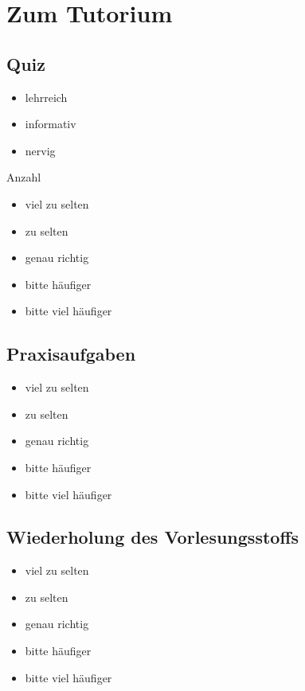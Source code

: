 \documentclass[11pt,a4paper,oneside]{scrartcl}
\begin{document}
\section{Zum Tutorium}
\subsection{Quiz}
    \begin{itemize}
        \item lehrreich
        \item informativ
        \item nervig
    \end{itemize}

Anzahl
    \begin{itemize}
        \item viel zu selten
        \item zu selten
        \item genau richtig
        \item bitte häufiger
        \item bitte viel häufiger
    \end{itemize}

\subsection{Praxisaufgaben}
    \begin{itemize}
        \item viel zu selten
        \item zu selten
        \item genau richtig
        \item bitte häufiger
        \item bitte viel häufiger
    \end{itemize}

\subsection{Wiederholung des Vorlesungsstoffs}
    \begin{itemize}
        \item viel zu selten
        \item zu selten
        \item genau richtig
        \item bitte häufiger
        \item bitte viel häufiger
    \end{itemize}
\end{document}
